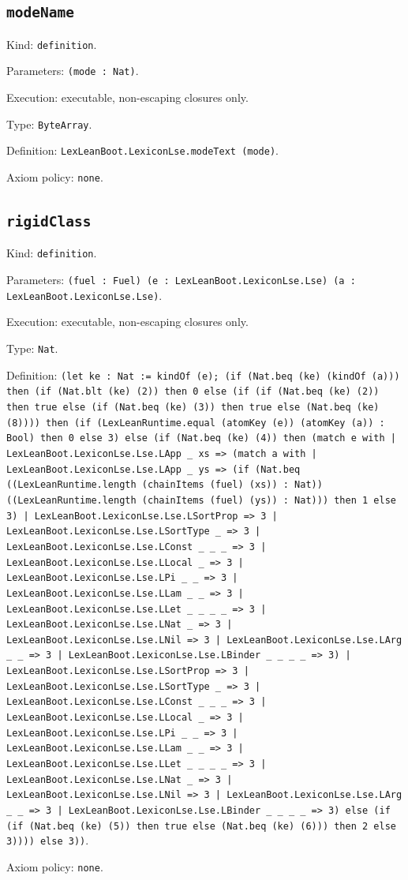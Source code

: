 \documentclass[11pt]{article}
\begin{document}
\subsection*{\texttt{modeName}}
\noindent Kind: \texttt{definition}.\par
\noindent Parameters: \texttt{(mode : Nat)}.\par
\noindent Execution: executable, non-escaping closures only.\par
\noindent Type: \texttt{ByteArray}.\par
\noindent Definition: \texttt{LexLeanBoot.LexiconLse.modeText (mode)}.\par
\noindent Axiom policy: \texttt{none}.\par
\subsection*{\texttt{rigidClass}}
\noindent Kind: \texttt{definition}.\par
\noindent Parameters: \texttt{(fuel : Fuel) (e : LexLeanBoot.LexiconLse.Lse) (a : LexLeanBoot.LexiconLse.Lse)}.\par
\noindent Execution: executable, non-escaping closures only.\par
\noindent Type: \texttt{Nat}.\par
\noindent Definition: \texttt{(let ke : Nat := kindOf (e); (if (Nat.beq (ke) (kindOf (a))) then (if (Nat.blt (ke) (2)) then 0 else (if (if (Nat.beq (ke) (2)) then true else (if (Nat.beq (ke) (3)) then true else (Nat.beq (ke) (8)))) then (if (LexLeanRuntime.equal (atomKey (e)) (atomKey (a)) : Bool) then 0 else 3) else (if (Nat.beq (ke) (4)) then (match e with | LexLeanBoot.LexiconLse.Lse.LApp \_ xs => (match a with | LexLeanBoot.LexiconLse.Lse.LApp \_ ys => (if (Nat.beq ((LexLeanRuntime.length (chainItems (fuel) (xs)) : Nat)) ((LexLeanRuntime.length (chainItems (fuel) (ys)) : Nat))) then 1 else 3) | LexLeanBoot.LexiconLse.Lse.LSortProp => 3 | LexLeanBoot.LexiconLse.Lse.LSortType \_ => 3 | LexLeanBoot.LexiconLse.Lse.LConst \_ \_ \_ => 3 | LexLeanBoot.LexiconLse.Lse.LLocal \_ => 3 | LexLeanBoot.LexiconLse.Lse.LPi \_ \_ => 3 | LexLeanBoot.LexiconLse.Lse.LLam \_ \_ => 3 | LexLeanBoot.LexiconLse.Lse.LLet \_ \_ \_ \_ => 3 | LexLeanBoot.LexiconLse.Lse.LNat \_ => 3 | LexLeanBoot.LexiconLse.Lse.LNil => 3 | LexLeanBoot.LexiconLse.Lse.LArg \_ \_ => 3 | LexLeanBoot.LexiconLse.Lse.LBinder \_ \_ \_ \_ => 3) | LexLeanBoot.LexiconLse.Lse.LSortProp => 3 | LexLeanBoot.LexiconLse.Lse.LSortType \_ => 3 | LexLeanBoot.LexiconLse.Lse.LConst \_ \_ \_ => 3 | LexLeanBoot.LexiconLse.Lse.LLocal \_ => 3 | LexLeanBoot.LexiconLse.Lse.LPi \_ \_ => 3 | LexLeanBoot.LexiconLse.Lse.LLam \_ \_ => 3 | LexLeanBoot.LexiconLse.Lse.LLet \_ \_ \_ \_ => 3 | LexLeanBoot.LexiconLse.Lse.LNat \_ => 3 | LexLeanBoot.LexiconLse.Lse.LNil => 3 | LexLeanBoot.LexiconLse.Lse.LArg \_ \_ => 3 | LexLeanBoot.LexiconLse.Lse.LBinder \_ \_ \_ \_ => 3) else (if (if (Nat.beq (ke) (5)) then true else (Nat.beq (ke) (6))) then 2 else 3)))) else 3))}.\par
\noindent Axiom policy: \texttt{none}.\par
\end{document}
